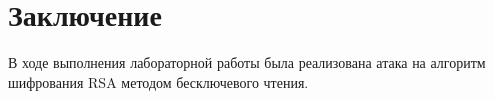\documentclass[a4paper, 14pt]{report}
\begin{document}
\chapter*{Заключение}
{}
В ходе выполнения лабораторной работы была реализована атака на алгоритм шифрования RSA методом бесключевого чтения.
\end{document}

